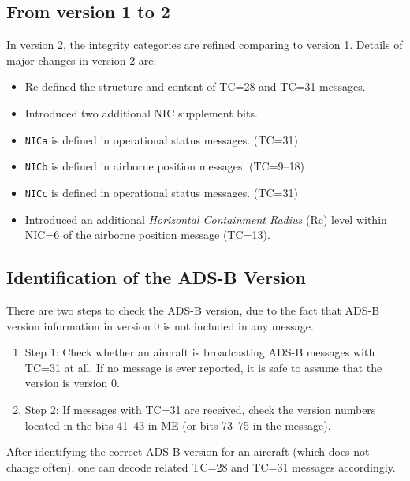 \subsection{From version 1 to 2}

In version 2, the integrity categories are refined comparing to version 1. Details of major changes in version 2 are:

\begin{itemize}
\item
  Re-defined the structure and content of TC=28 and TC=31 messages.
\item
  Introduced two additional NIC supplement bits.
\item
  \texttt{NICa} is defined in operational status messages.
  (TC=31)
\item
  \texttt{NICb} is defined in airborne position messages.
  (TC=9--18)
\item
  \texttt{NICc} is defined in operational status messages.
  (TC=31)
\item
  Introduced an additional \emph{Horizontal Containment Radius} (Rc) level within NIC=6 of the airborne position message (TC=13).
\end{itemize}

\subsection{Identification of the ADS-B Version}

There are two steps to check the ADS-B version, due to the fact that ADS-B version information in version 0 is not included in any message.

\begin{enumerate}
\def\labelenumi{\arabic{enumi}.}
\item
  Step 1: Check whether an aircraft is broadcasting ADS-B messages with   TC=31 at all. If no message is ever reported, it is safe to assume that the version is version 0.
\item
  Step 2: If messages with TC=31 are received, check the version numbers located in the bits 41--43 in ME (or bits 73--75 in the message).
\end{enumerate}

After identifying the correct ADS-B version for an aircraft (which does not change often), one can decode related TC=28 and TC=31 messages accordingly.



